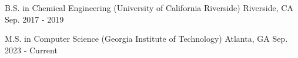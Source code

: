 

\begin{cventries}

  \cventry
    {B.S. in Chemical Engineering} %
    {(University of California Riverside)} %
    {Riverside, CA} %
    {Sep. 2017 - 2019} %
    {}

  \cventry
    {M.S. in Computer Science} %
    {(Georgia Institute of Technology)} %
    {Atlanta, GA} %
    {Sep. 2023 - Current} %
    {}

\end{cventries}
